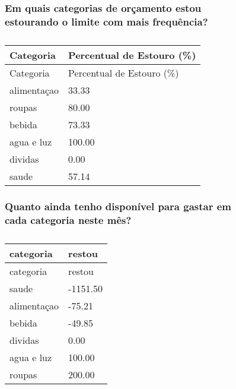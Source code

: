 \documentclass[
  8pt,
  a4paper,
  DIV=11,
  numbers=noendperiod]{scrartcl}
\begin{document}
\begin{figure}

\begin{minipage}{0.50\linewidth}

\subsubsection{Em quais categorias de orçamento estou estourando o
limite com mais
frequência?}\label{em-quais-categorias-de-oruxe7amento-estou-estourando-o-limite-com-mais-frequuxeancia}

\begin{longtable}[]{@{}ll@{}}
\caption{}\label{T_95a98}\tabularnewline
\toprule\noalign{}
Categoria & Percentual de Estouro (\%) \\
\midrule\noalign{}
\endfirsthead
\toprule\noalign{}
Categoria & Percentual de Estouro (\%) \\
\midrule\noalign{}
\endhead
\bottomrule\noalign{}
\endlastfoot
alimentaçao & 33.33 \\
roupas & 80.00 \\
bebida & 73.33 \\
agua e luz & 100.00 \\
dividas & 0.00 \\
saude & 57.14 \\
\end{longtable}

\end{minipage}%
%
\begin{minipage}{0.50\linewidth}

\subsubsection{Quanto ainda tenho disponível para gastar em cada
categoria neste
mês?}\label{quanto-ainda-tenho-disponuxedvel-para-gastar-em-cada-categoria-neste-muxeas}

\begin{longtable}[]{@{}ll@{}}
\caption{}\label{T_06486}\tabularnewline
\toprule\noalign{}
categoria & restou \\
\midrule\noalign{}
\endfirsthead
\toprule\noalign{}
categoria & restou \\
\midrule\noalign{}
\endhead
\bottomrule\noalign{}
\endlastfoot
saude & -1151.50 \\
alimentaçao & -75.21 \\
bebida & -49.85 \\
dividas & 0.00 \\
agua e luz & 100.00 \\
roupas & 200.00 \\
\end{longtable}

\end{minipage}%

\end{figure}%
\end{document}
